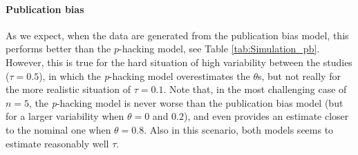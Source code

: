 \documentclass[preprint, authoryear]{elsarticle}
\theoremstyle{plain}
\theoremstyle{definition}
\begin{document}
\paragraph{Publication bias} As we expect, when the data are generated from the publication bias model, this performs better than the $p$-hacking model, see Table \ref{tab:Simulation_pb}. However, this is true for the hard situation of high variability between the studies ($\tau = 0.5$), in which the \emph{p}-hacking model overestimates the $\theta$s, but not really for the more realistic situation of $\tau = 0.1$. Note that, in the most challenging case of $n=5$, the \emph{p}-hacking model is never worse than the publication bias model (but for a larger variability when $\theta = 0$ and $0.2$), and even provides an estimate closer to the nominal one when $\theta = 0.8$. Also in this scenario, both models seems to estimate reasonably well $\tau$.
\end{document}
